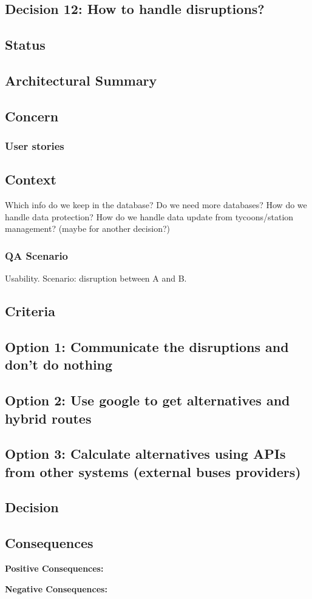 \subsection{Decision 12: How to handle disruptions?}

\subsection*{Status}

\subsection*{Architectural Summary}


\subsection*{Concern}
\subsubsection*{User stories}

\subsection*{Context}
Which info do we keep in the database? 
Do we need more databases?
How do we handle data protection?
How do we handle data update from tycoons/station management? (maybe for another decision?)

\subsubsection*{QA Scenario} %
Usability.
Scenario: disruption between A and B.
\subsection*{Criteria}
\begin{itemize}
\end{itemize}

\subsection*{Option 1: Communicate the disruptions and don't do nothing}
\subsection*{Option 2: Use google to get alternatives and hybrid routes}
\subsection*{Option 3: Calculate alternatives using APIs from other systems (external buses providers)}


\subsection*{Decision}

\subsection*{Consequences}
\textbf{Positive Consequences:}
\begin{itemize}
\end{itemize}
\textbf{Negative Consequences:}
\begin{itemize}
\end{itemize}